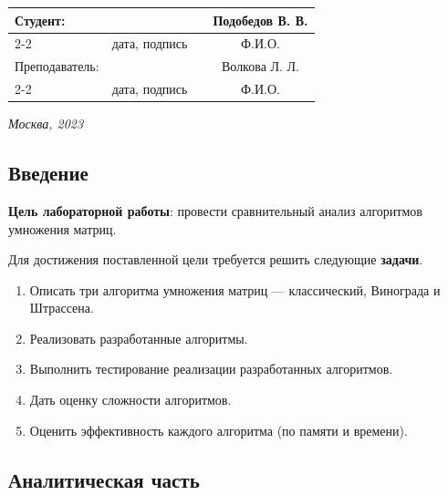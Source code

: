 \documentclass[12pt, a4paper]{article}
\begin{document}
\begin{titlepage}
  \fontsize{14}{21}\selectfont
  \vspace{5cm}


  \noindent\begin{tabularx}{\textwidth}{ X >{\centering}p{4cm} p{1cm} c }
   Студент: & & & Подобедов В. В. \\ \cline{2-2} \cline{4-4}
   & \fontsize{10}{15}\selectfont дата, подпись & & \fontsize{10}{15}\selectfont Ф.И.О. \\
   Преподаватель: & & & Волкова Л. Л.\\ \cline{2-2} \cline{4-4}
   & \fontsize{10}{15}\selectfont дата, подпись & & \fontsize{10}{15}\selectfont Ф.И.О.
  \end{tabularx}

  \vspace{\fill}

  \begin{center}
   \it{Москва}, 2023
  \end{center}

  \thispagestyle{empty}
\end{titlepage}

\renewcommand{\contentsname}{Содержание}
\setcounter{page}{2}
\tableofcontents

\newpage
\begin{center}
   \section*{Введение} 
\end{center}
\justifying
\textbf{Цель лабораторной работы}: провести сравнительный анализ алгоритмов умножения матриц.

Для достижения поставленной цели требуется решить следующие \textbf{задачи}.
\begin{enumerate}
\item Описать три алгоритма умножения матриц --- классический, Винограда и Штрассена.
\item Реализовать разработанные алгоритмы.
\item Выполнить тестирование реализации разработанных алгоритмов.
\item Дать оценку сложности алгоритмов.
\item Оценить эффективность каждого алгоритма (по памяти и времени).
\end{enumerate}

\newpage
\begin{center}
   \section{Аналитическая часть} 
\end{center}
\end{document}
